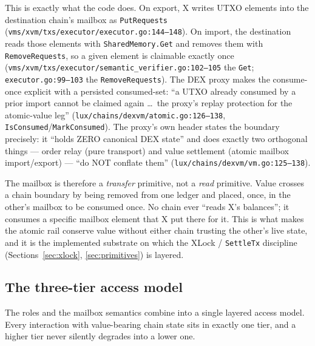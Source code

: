 This is exactly what the code does. On export, X writes UTXO elements
into the destination chain's mailbox as \texttt{PutRequests}
(\texttt{vms/xvm/txs/executor/executor.go:144--148}). \IMPL{} On import,
the destination reads those elements with \texttt{SharedMemory.Get} and
removes them with \texttt{RemoveRequests}, so a given element is
claimable exactly once
(\texttt{vms/xvm/txs/executor/semantic\_verifier.go:102--105} the
\texttt{Get}; \texttt{executor.go:99--103} the \texttt{RemoveRequests}).
\IMPL{} The DEX proxy makes the consume-once explicit with a persisted
consumed-set: ``a UTXO already consumed by a prior import cannot be
claimed again \ldots\ the proxy's replay protection for the
atomic-value leg'' (\texttt{lux/chains/dexvm/atomic.go:126--138},
\texttt{IsConsumed}/\texttt{MarkConsumed}). \IMPL{} The proxy's own
header states the boundary precisely: it ``holds ZERO canonical DEX
state'' and does exactly two orthogonal things --- order relay (pure
transport) and value settlement (atomic mailbox import/export) ---
``do NOT conflate them'' (\texttt{lux/chains/dexvm/vm.go:125--138}).
\IMPL{}

\noindent The mailbox is therefore a \emph{transfer} primitive, not a
\emph{read} primitive. Value crosses a chain boundary by being removed
from one ledger and placed, once, in the other's mailbox to be consumed
once. No chain ever ``reads X's balances''; it consumes a specific
mailbox element that X put there for it. This is what makes the atomic
rail conserve value without either chain trusting the other's live
state, and it is the implemented substrate on which the XLock /
\texttt{SettleTx} discipline (Sections~\ref{sec:xlock},
\ref{sec:primitives}) is layered.

\subsection{The three-tier access model}

The roles and the mailbox semantics combine into a single layered
access model. Every interaction with value-bearing chain state sits in
exactly one tier, and a higher tier never silently degrades into a
lower one.

